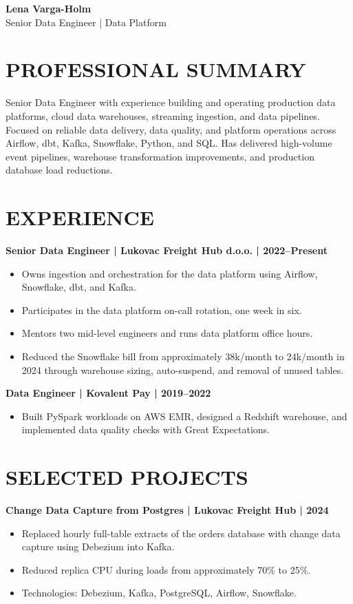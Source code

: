 \documentclass[11pt,a4paper]{article}
\begin{document}
{\begin{center}
{\Huge\bfseries\color{primarycolor} Lena Varga-Holm}\\[0.3em]
{\large\color{accentcolor} Senior Data Engineer | Data Platform}
\end{center}}

\section*{PROFESSIONAL SUMMARY}
Senior Data Engineer with experience building and operating production data platforms, cloud data warehouses, streaming ingestion, and data pipelines. Focused on reliable data delivery, data quality, and platform operations across Airflow, dbt, Kafka, Snowflake, Python, and SQL. Has delivered high-volume event pipelines, warehouse transformation improvements, and production database load reductions.

\section*{EXPERIENCE}
\textbf{Senior Data Engineer | Lukovac Freight Hub d.o.o. | 2022–Present}
\begin{itemize}
\item Owns ingestion and orchestration for the data platform using Airflow, Snowflake, dbt, and Kafka.
\item Participates in the data platform on-call rotation, one week in six.
\item Mentors two mid-level engineers and runs data platform office hours.
\item Reduced the Snowflake bill from approximately 38k/month to 24k/month in 2024 through warehouse sizing, auto-suspend, and removal of unused tables.
\end{itemize}

\textbf{Data Engineer | Kovalent Pay | 2019–2022}
\begin{itemize}
\item Built PySpark workloads on AWS EMR, designed a Redshift warehouse, and implemented data quality checks with Great Expectations.
\end{itemize}

\section*{SELECTED PROJECTS}
\textbf{Change Data Capture from Postgres | Lukovac Freight Hub | 2024}
\begin{itemize}
\item Replaced hourly full-table extracts of the orders database with change data capture using Debezium into Kafka.
\item Reduced replica CPU during loads from approximately 70\% to 25\%.
\item Technologies: Debezium, Kafka, PostgreSQL, Airflow, Snowflake.
\end{itemize}
\end{document}
